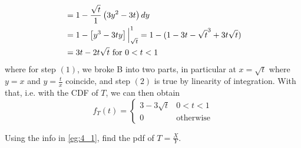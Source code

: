 \documentclass[notoc,notitlepage]{tufte-book}
\begin{document}
\begin{solution}
\begin{align*}
                  &= 1 - \frac{\sqrt{t}}{1} \left( 3y^2 - 3t \right) \mathop{}\!d{y} \\
                  &= 1 - \left[ y^3 - 3ty \right]\Big|_{\sqrt{t}}^{1} = 1 - ( 1 - 3t - \sqrt{t}^3 + 3t \sqrt{t} ) \\
                  &= 3t - 2t\sqrt{t} \text{ for } 0 < t < 1
  \end{align*}
  where for step $(1)$, we broke B into two parts, in particular at $x = \sqrt{t}$ where $y = x$ and $y = \frac{t}{x}$ coincide, and step $(2)$ is true by linearity of integration. With that, i.e. with the CDF of $T$, we can then obtain
  \begin{equation*}
    f_T(t) = \begin{cases}
      3 - 3\sqrt{t} & 0 < t < 1 \\
      0             & \text{otherwise}
    \end{cases}
  \end{equation*}
\end{solution}

\begin{eg}
  Using the info in \cref{eg:4_1}, find the pdf of $T = \frac{X}{Y}$.
\end{eg}
\end{document}
